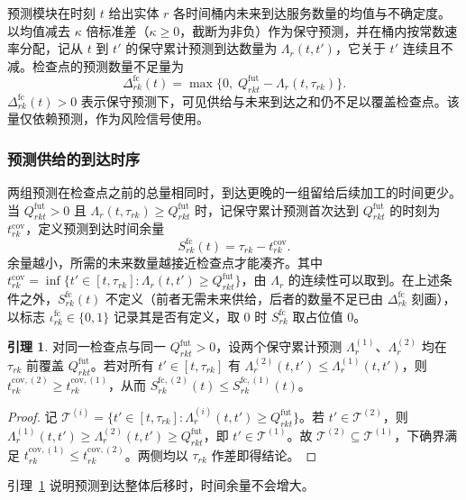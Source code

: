 \documentclass[12pt,a4paper]{article}
\theoremstyle{definition}
\newtheorem{lemma}{引理}
\begin{document}
预测模块在时刻 $t$ 给出实体 $r$ 各时间桶内未来到达服务数量的均值与不确定度。以均值减去 $\kappa$ 倍标准差（$\kappa\ge0$，截断为非负）作为保守预测，并在桶内按常数速率分配，记从 $t$ 到 $t'$ 的保守累计预测到达数量为 $\Lambda_r(t,t')$，它关于 $t'$ 连续且不减。检查点的预测数量不足量为
\begin{equation}\label{eq:dfc}
  \Delta^{\mathrm{fc}}_{rk}(t)=\max\bigl\{0,\;Q^{\mathrm{fut}}_{rkt}-\Lambda_r(t,\tau_{rk})\bigr\}.
\end{equation}
$\Delta^{\mathrm{fc}}_{rk}(t)>0$ 表示保守预测下，可见供给与未来到达之和仍不足以覆盖检查点。该量仅依赖预测，作为风险信号使用。

\subsubsection{预测供给的到达时序}

两组预测在检查点之前的总量相同时，到达更晚的一组留给后续加工的时间更少。当 $Q^{\mathrm{fut}}_{rkt}>0$ 且 $\Lambda_r(t,\tau_{rk})\ge Q^{\mathrm{fut}}_{rkt}$ 时，记保守累计预测首次达到 $Q^{\mathrm{fut}}_{rkt}$ 的时刻为 $t^{\mathrm{cov}}_{rk}$，定义预测到达时间余量
\begin{equation}\label{eq:sfc}
  S^{\mathrm{fc}}_{rk}(t)=\tau_{rk}-t^{\mathrm{cov}}_{rk}.
\end{equation}
余量越小，所需的未来数量越接近检查点才能凑齐。其中 $t^{\mathrm{cov}}_{rk}=\inf\{t'\in[t,\tau_{rk}]:\Lambda_r(t,t')\ge Q^{\mathrm{fut}}_{rkt}\}$，由 $\Lambda_r$ 的连续性可以取到。在上述条件之外，$S^{\mathrm{fc}}_{rk}(t)$ 不定义（前者无需未来供给，后者的数量不足已由 $\Delta^{\mathrm{fc}}_{rk}$ 刻画），以标志 $\iota^{\mathrm{fc}}_{rk}\in\{0,1\}$ 记录其是否有定义，取 0 时 $S^{\mathrm{fc}}_{rk}$ 取占位值 0。

\begin{lemma}\label{lem:shift}
对同一检查点与同一 $Q^{\mathrm{fut}}_{rkt}>0$，设两个保守累计预测 $\Lambda^{(1)}_r$、$\Lambda^{(2)}_r$ 均在 $\tau_{rk}$ 前覆盖 $Q^{\mathrm{fut}}_{rkt}$。若对所有 $t'\in[t,\tau_{rk}]$ 有 $\Lambda^{(2)}_r(t,t')\le\Lambda^{(1)}_r(t,t')$，则 $t^{\mathrm{cov},(2)}_{rk}\ge t^{\mathrm{cov},(1)}_{rk}$，从而 $S^{\mathrm{fc},(2)}_{rk}(t)\le S^{\mathrm{fc},(1)}_{rk}(t)$。
\end{lemma}
\begin{proof}
记 $\mathcal{T}^{(i)}=\{t'\in[t,\tau_{rk}]:\Lambda^{(i)}_r(t,t')\ge Q^{\mathrm{fut}}_{rkt}\}$。若 $t'\in\mathcal{T}^{(2)}$，则 $\Lambda^{(1)}_r(t,t')\ge\Lambda^{(2)}_r(t,t')\ge Q^{\mathrm{fut}}_{rkt}$，即 $t'\in\mathcal{T}^{(1)}$。故 $\mathcal{T}^{(2)}\subseteq\mathcal{T}^{(1)}$，下确界满足 $t^{\mathrm{cov},(1)}_{rk}\le t^{\mathrm{cov},(2)}_{rk}$。两侧均以 $\tau_{rk}$ 作差即得结论。
\end{proof}
引理~\ref{lem:shift} 说明预测到达整体后移时，时间余量不会增大。
\end{document}
